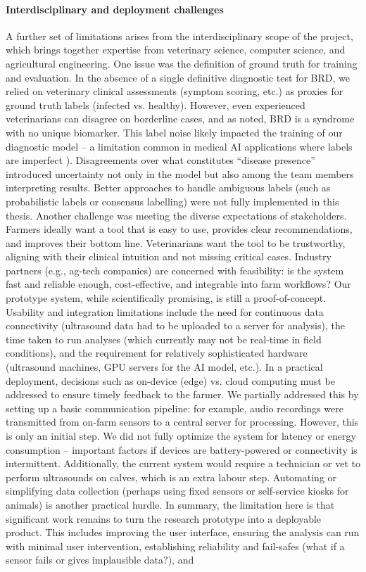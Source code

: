 \paragraph{Interdisciplinary and deployment challenges} A further set of limitations arises from the interdisciplinary scope of the project, which brings together expertise from veterinary science, computer science, and agricultural engineering. One issue was the definition of ground truth for training and evaluation. In the absence of a single definitive diagnostic test for BRD, we relied on veterinary clinical assessments (symptom scoring, etc.) as proxies for ground truth labels (infected vs. healthy). However, even experienced veterinarians can disagree on borderline cases, and as noted, BRD is a syndrome with no unique biomarker. This label noise likely impacted the training of our diagnostic model – a limitation common in medical AI applications where labels are imperfect \cite{roy2019weak}). Disagreements over what constitutes “disease presence” introduced uncertainty not only in the model but also among the team members interpreting results. Better approaches to handle ambiguous labels (such as probabilistic labels or consensus labelling) were not fully implemented in this thesis. Another challenge was meeting the diverse expectations of stakeholders. Farmers ideally want a tool that is easy to use, provides clear recommendations, and improves their bottom line. Veterinarians want the tool to be trustworthy, aligning with their clinical intuition and not missing critical cases. Industry partners (e.g., ag-tech companies) are concerned with feasibility: is the system fast and reliable enough, cost-effective, and integrable into farm workflows? Our prototype system, while scientifically promising, is still a proof-of-concept. Usability and integration limitations include the need for continuous data connectivity (ultrasound data had to be uploaded to a server for analysis), the time taken to run analyses (which currently may not be real-time in field conditions), and the requirement for relatively sophisticated hardware (ultrasound machines, GPU servers for the AI model, etc.). In a practical deployment, decisions such as on-device (edge) vs. cloud computing must be addressed to ensure timely feedback to the farmer. We partially addressed this by setting up a basic communication pipeline: for example, audio recordings were transmitted from on-farm sensors to a central server for processing. However, this is only an initial step. We did not fully optimize the system for latency or energy consumption – important factors if devices are battery-powered or connectivity is intermittent. Additionally, the current system would require a technician or vet to perform ultrasounds on calves, which is an extra labour step. Automating or simplifying data collection (perhaps using fixed sensors or self-service kiosks for animals) is another practical hurdle. In summary, the limitation here is that significant work remains to turn the research prototype into a deployable product. This includes improving the user interface, ensuring the analysis can run with minimal user intervention, establishing reliability and fail-safes (what if a sensor fails or gives implausible data?), and 